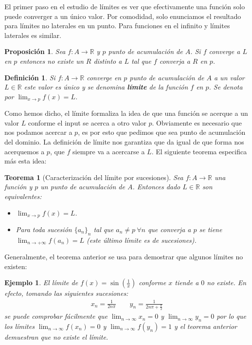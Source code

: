 \documentclass{article}
\newtheorem{theorem}{Teorema}
\newtheorem{prop}{Proposición}
\newtheorem{define}{Definición}
\newtheorem{ejem}{Ejemplo}
\newcommand{\reales}{\mathbb{R}}
\begin{document}
El primer paso en el estudio de límites es ver que efectivamente una función solo puede converger a un único valor. Por comodidad, solo enunciamos el resultado para límites no laterales en un punto. Para funciones en el infinito y límites laterales es similar.

\begin{prop}
	Sea $f: A \rightarrow \reales$ y $p$ punto de acumulación de $A$. Si $f$ converge a $L$ en $p$ entonces no existe un $R$ distinto a $L$ tal que $f$ converja a $R$ en $p$.
\end{prop}

\begin{define}
	Si $f: A \rightarrow \reales$ converge en $p$ punto de acumulación de $A$ a un valor $L \in \reales$ este valor es único y se denomina \textbf{límite} de la función $f$ en $p$. Se denota por $\lim_{x \rightarrow p} f(x) = L$.
\end{define}

Como hemos dicho, el límite formaliza la idea de que una función se acerque a un valor $L$ conforme el input se acerca a otro valor $p$. Obviamente es necesario que nos podamos acercar a $p$, es por esto que pedimos que sea punto de acumulación del dominio. La definición de límite nos garantiza que da igual de que forma nos acerquemos a $p$, que $f$ siempre va a acercarse a $L$. El siguiente teorema especifica más esta idea:
\begin{theorem}[Caracterización del límite por sucesiones]
	Sea $f: A \rightarrow \reales$ una función y $p$ un punto de acumulación de $A$. Entonces dado $L \in \reales$ son equivalentes:
	\begin{itemize}
		\item
		$\lim_{x \rightarrow p} f(x) = L$.
		\item
		Para toda sucesión $\{a_n \}_n$ tal que $a_n \neq p\ \forall n$ que converja a $p$ se tiene $\lim_{n \rightarrow +\infty} f(a_n) = L$ (este último límite es de sucesiones).
	\end{itemize}
\end{theorem}

Generalmente, el teorema anterior se usa para demostrar que algunos límites no existen:
\begin{ejem}
	El límite de $f(x) = \sin (\frac{1}{x})$ conforme $x$ tiende a $0$ no existe. En efecto, tomando las siguientes sucesiones:
	\begin{align*}
		x_n = \frac{1}{2n\pi} \qquad y_n = \frac{1}{2n\pi + \frac{\pi}{2}}
	\end{align*}
	se puede comprobar fácilmente que $\lim_{n\rightarrow\infty} x_n = 0$ y $\lim_{n\rightarrow\infty} y_n = 0$ por lo que los límites $\lim_{n\rightarrow\infty}f(x_n) = 0$ y $\lim_{n\rightarrow\infty}f(y_n) = 1$ y el teorema anterior demuestran que no existe el límite.
\end{ejem}
\end{document}
